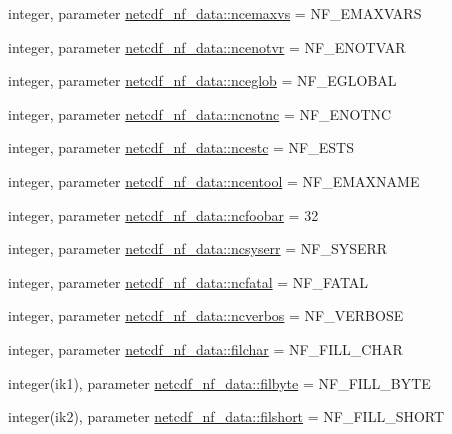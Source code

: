 \begin{DoxyCompactItemize}
\item 
integer, parameter \hyperlink{namespacenetcdf__nf__data_ae7841d937011b029b4abd6162d4d2965}{netcdf\+\_\+nf\+\_\+data\+::ncemaxvs} = N\+F\+\_\+\+E\+M\+A\+X\+V\+A\+RS
\item 
integer, parameter \hyperlink{namespacenetcdf__nf__data_a95cc359e752fa7c1a3d304f5106e8b68}{netcdf\+\_\+nf\+\_\+data\+::ncenotvr} = N\+F\+\_\+\+E\+N\+O\+T\+V\+AR
\item 
integer, parameter \hyperlink{namespacenetcdf__nf__data_acd598d65a90ae610ec8c36dc63624fe2}{netcdf\+\_\+nf\+\_\+data\+::nceglob} = N\+F\+\_\+\+E\+G\+L\+O\+B\+AL
\item 
integer, parameter \hyperlink{namespacenetcdf__nf__data_a7887a4216eec236300a3e90dbf3dda74}{netcdf\+\_\+nf\+\_\+data\+::ncnotnc} = N\+F\+\_\+\+E\+N\+O\+T\+NC
\item 
integer, parameter \hyperlink{namespacenetcdf__nf__data_acc1032f6b8020ae57c664b22f3161bf7}{netcdf\+\_\+nf\+\_\+data\+::ncestc} = N\+F\+\_\+\+E\+S\+TS
\item 
integer, parameter \hyperlink{namespacenetcdf__nf__data_aa9bc47547a7261640aebf2e20f967866}{netcdf\+\_\+nf\+\_\+data\+::ncentool} = N\+F\+\_\+\+E\+M\+A\+X\+N\+A\+ME
\item 
integer, parameter \hyperlink{namespacenetcdf__nf__data_aad2cb51e82e60bfb7499e5f251482faa}{netcdf\+\_\+nf\+\_\+data\+::ncfoobar} = 32
\item 
integer, parameter \hyperlink{namespacenetcdf__nf__data_a1ce26f218da522526f3bb20543e9c1c4}{netcdf\+\_\+nf\+\_\+data\+::ncsyserr} = N\+F\+\_\+\+S\+Y\+S\+E\+RR
\item 
integer, parameter \hyperlink{namespacenetcdf__nf__data_a3c44eb7317355a785acb2879bc8d9836}{netcdf\+\_\+nf\+\_\+data\+::ncfatal} = N\+F\+\_\+\+F\+A\+T\+AL
\item 
integer, parameter \hyperlink{namespacenetcdf__nf__data_ac74be92e9885bedd9ae5a5640352740e}{netcdf\+\_\+nf\+\_\+data\+::ncverbos} = N\+F\+\_\+\+V\+E\+R\+B\+O\+SE
\item 
integer, parameter \hyperlink{namespacenetcdf__nf__data_acbdcbd98efe04141031a6af275d611e8}{netcdf\+\_\+nf\+\_\+data\+::filchar} = N\+F\+\_\+\+F\+I\+L\+L\+\_\+\+C\+H\+AR
\item 
integer(ik1), parameter \hyperlink{namespacenetcdf__nf__data_a17562ee56c26af08b2773cbc1f8ab9f6}{netcdf\+\_\+nf\+\_\+data\+::filbyte} = N\+F\+\_\+\+F\+I\+L\+L\+\_\+\+B\+Y\+TE
\item 
integer(ik2), parameter \hyperlink{namespacenetcdf__nf__data_af13f87c54c776a72a7176c396daa0331}{netcdf\+\_\+nf\+\_\+data\+::filshort} = N\+F\+\_\+\+F\+I\+L\+L\+\_\+\+S\+H\+O\+RT

\end{DoxyCompactItemize}
